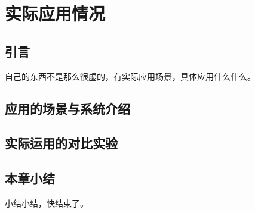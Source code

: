 \chapter{实际应用情况}

\section{引言}

自己的东西不是那么很虚的，有实际应用场景，具体应用什么什么。



\section{应用的场景与系统介绍}


\section{实际运用的对比实验}


\section{本章小结}


小结小结，快结束了。